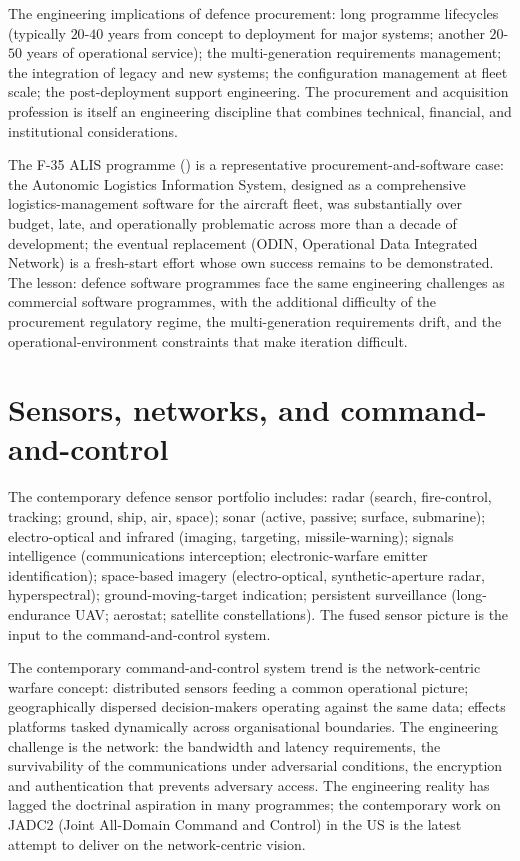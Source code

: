 The engineering implications of defence procurement: long programme lifecycles (typically $20$-$40$ years from concept to deployment for major systems; another $20$-$50$ years of operational service); the multi-generation requirements management; the integration of legacy and new systems; the configuration management at fleet scale; the post-deployment support engineering. The procurement and acquisition profession is itself an engineering discipline that combines technical, financial, and institutional considerations.

The F-35 ALIS programme (\cite{acc:gao-f35-alis-2020}) is a representative procurement-and-software case: the Autonomic Logistics Information System, designed as a comprehensive logistics-management software for the aircraft fleet, was substantially over budget, late, and operationally problematic across more than a decade of development; the eventual replacement (ODIN, Operational Data Integrated Network) is a fresh-start effort whose own success remains to be demonstrated. The lesson: defence software programmes face the same engineering challenges as commercial software programmes, with the additional difficulty of the procurement regulatory regime, the multi-generation requirements drift, and the operational-environment constraints that make iteration difficult.

\section{Sensors, networks, and command-and-control}

The contemporary defence sensor portfolio includes: radar (search, fire-control, tracking; ground, ship, air, space); sonar (active, passive; surface, submarine); electro-optical and infrared (imaging, targeting, missile-warning); signals intelligence (communications interception; electronic-warfare emitter identification); space-based imagery (electro-optical, synthetic-aperture radar, hyperspectral); ground-moving-target indication; persistent surveillance (long-endurance UAV; aerostat; satellite constellations). The fused sensor picture is the input to the command-and-control system.

The contemporary command-and-control system trend is the network-centric warfare concept: distributed sensors feeding a common operational picture; geographically dispersed decision-makers operating against the same data; effects platforms tasked dynamically across organisational boundaries. The engineering challenge is the network: the bandwidth and latency requirements, the survivability of the communications under adversarial conditions, the encryption and authentication that prevents adversary access. The engineering reality has lagged the doctrinal aspiration in many programmes; the contemporary work on JADC2 (Joint All-Domain Command and Control) in the US is the latest attempt to deliver on the network-centric vision.

